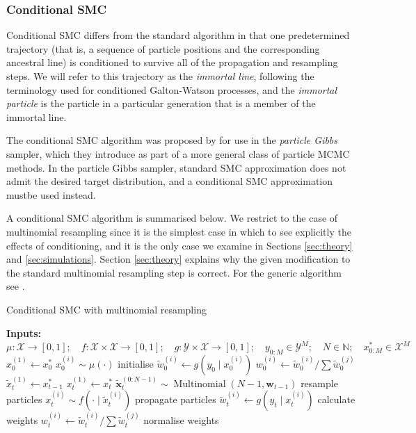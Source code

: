 \documentclass{article}
\begin{document}
\subsubsection{Conditional SMC}
Conditional SMC differs from the standard algorithm in that one predetermined trajectory (that is, a sequence of particle positions and the corresponding ancestral line) is conditioned to survive all of the propagation and resampling steps. We will refer to this trajectory as the \emph{immortal line}, following the terminology used for conditioned Galton-Watson processes, and the \emph{immortal particle} is the particle in a particular generation that is a member of the immortal line.

The conditional SMC algorithm was proposed by \citet{andrieu2010} for use in the \emph{particle Gibbs} sampler, which they introduce as part of a more general class of particle MCMC methods. In the particle Gibbs sampler, standard SMC approximation does not admit the desired target distribution, and a conditional SMC approximation mustbe used instead.

A conditional SMC algorithm is summarised below. We restrict to the case of multinomial resampling since it is the simplest case in which to see explicitly the effects of conditioning, and it is the only case we examine in Sections \ref{sec:theory} and \ref{sec:simulations}. Section \ref{sec:theory} explains why the given modification to the standard multinomial resampling step is correct. For the generic algorithm see \citet[Section 4.3]{andrieu2010}.
\begin{algorithm}
	\caption{Conditional SMC with multinomial resampling}\label{alg:condSMC}
	\begin{algorithmic}[0]
    	\State \textbf{Inputs:} $\mu:\mathcal{X}\to[0,1];\quad f:\mathcal{X}\times\mathcal{X}\to[0,1];\quad g:\mathcal{Y}\times\mathcal{X}\to[0,1];\quad y_{0:M}\in\mathcal{Y}^M;\quad N\in\mathbb{N}; \quad x_{0:M}^* \in \mathcal{X}^M$
    	\State $x_0^{(1)} \gets x_0^*$
			\State $x_0^{(i)} \sim \mu(\cdot)$ \Comment initialise
		\EndFor
			\State $\tilde{w}_0^{(i)} \gets g(y_0 \mid x_0^{(i)})$
			\State $w_0^{(i)} \gets \tilde{w}_0^{(i)} / \sum \tilde{w}_0^{(j)}$
		\EndFor
			\State $\tilde{x}_t^{(1)} \gets x_{t-1}^*$
			\State $x_t^{(1)} \gets x_t^*$
			\State $\tilde{\mathbf{x}}_t^{(0:N-1)} \sim \operatorname{Multinomial}(N-1, \mathbf{w}_{t-1})$ \Comment resample particles
				\State $x_t^{(i)} \sim f(\cdot \mid \tilde{x}_t^{(i)})$ \Comment propagate particles
			\EndFor
				\State $\tilde{w}_t^{(i)} \gets g(y_t \mid x_t^{(i)})$ \Comment calculate weights
				\State $w_t^{(i)} \gets \tilde{w}_t^{(i)} / \sum \tilde{w}_t^{(j)}$ \Comment normalise weights
        	\EndFor
        \EndFor
	\end{algorithmic}
\end{algorithm}
\end{document}
